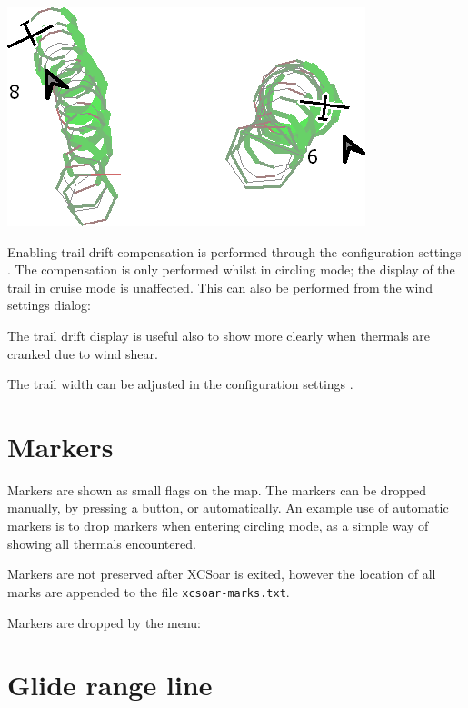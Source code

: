 \documentclass[a4paper,12pt]{refrep}
\begin{document}
\begin{center}
\includegraphics[angle=0,width=0.8\linewidth,keepaspectratio='true']{figures/traildrift.png}
\end{center}

Enabling trail drift compensation is performed through the
configuration settings .  The compensation is only performed
whilst in circling mode; the display of the trail in cruise mode is unaffected.
This can also be performed from the wind settings dialog:
\begin{quote}
\blink{}
\end{quote}

The trail drift display is useful also to show more clearly when thermals
are cranked due to wind shear.

The trail width can be adjusted in the configuration settings .

\section{Markers}

Markers are shown as small flags on the map.  The markers can be dropped
manually, by pressing a button, or automatically.  An example use of
automatic markers is to drop markers when entering circling mode, as a
simple way of showing all thermals encountered.

Markers are not preserved after XCSoar is exited, however the location
of all marks are appended to the file \verb|xcsoar-marks.txt|.

Markers are dropped by the menu: 
\begin{quote}
\blink{}
\end{quote}

\section{Glide range line}
\end{document}
